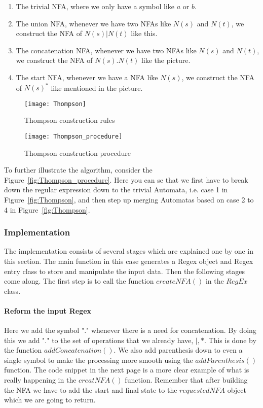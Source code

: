 \documentclass[
12pt, %
a4paper, %
oneside, %
headinclude,footinclude, %
BCOR5mm, %
]{scrartcl}
\begin{document}
\begin{enumerate}
	\item The trivial NFA, where we only have a symbol like $a$ or $b$.
	\item The union NFA, whenever we have two NFAs like $N(s)$ and $N(t)$, we construct the NFA of $N(s) | N(t)$ like this.
	\item The concatenation NFA, whenever we have two NFAs like $N(s)$ and $N(t)$, we construct the NFA of $N(s).N(t)$ like the picture.
	\item The start NFA, whenever we have a NFA like $N(s)$, we construct the NFA of $N(s)^{*}$ like mentioned in the picture.
\end{enumerate}

\begin{figure}[tb]
	\centering 
	\texttt{[image: Thompson]} 
	\caption[]{Thompson construction rules}
	\label{fig:Thompson} 
\end{figure}

\begin{figure}[tb]
	\centering 
	\texttt{[image: Thompson\_procedure]} 
	\caption[]{Thompson construction procedure}
	\label{fig:Thompson_procedure} 
\end{figure}

To further illustrate the algorithm, consider the Figure~\vref{fig:Thompson_procedure}. Here you can se that we first have to break down the regular expression down to the trivial Automata, i.e. case 1 in Figure~\vref{fig:Thompson}, and then step up merging Automatas based on case 2 to 4 in Figure~\vref{fig:Thompson}. 

\subsubsection{Implementation}
The implementation consists of several stages which are explained one by one in this section. The main function in this case generates a Regex object and Regex entry class to store and manipulate the input data. Then the following stages come along. The first step is to call the function $createNFA()$ in the $RegEx$ class. 

\paragraph{Reform the input Regex}
Here we add the symbol "." whenever there is a need for concatenation. By doing this we add "." to the set of operations that we already have, ${|, *}$. This is done by the function $addConcatenation()$. We also add parenthesis down to even a single symbol to make the processing more smooth using the $addParenthesis()$ function. The code snippet in the next page is a more clear example of what is really happening in the $creatNFA()$ function. Remember that after building the NFA we have to add the start and final state to the $requestedNFA$ object which we are going to return.
\end{document}
